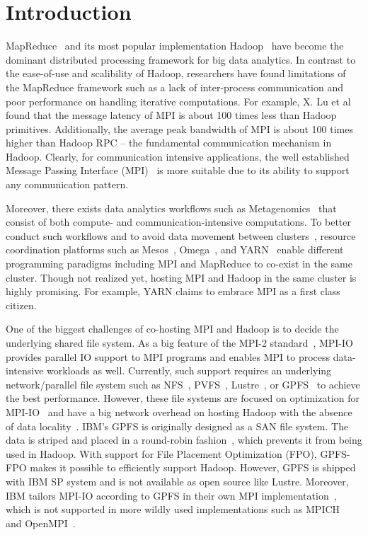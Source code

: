 \section{Introduction}
MapReduce~\cite{mr} and its most popular implementation Hadoop~\cite{hadoop}
have become the dominant distributed processing framework for big data
analytics. In contrast to the ease-of-use and scalibility of Hadoop, researchers
have found limitations of the MapReduce framework such as a lack of inter-process
communication and poor performance on handling iterative computations. For
example, X. Lu et al~\cite{xlu} found that the message latency of MPI is about
100 times less than Hadoop primitives. Additionally, the average peak bandwidth of MPI is
about 100 times higher than Hadoop RPC -- the fundamental communication
mechanism in Hadoop. Clearly, for communication intensive applications, the well established Message Passing
Interface (MPI)~\cite{mpi2012} is more suitable due to its ability to support
any communication pattern.
 
Moreover, there exists data analytics workflows such as
Metagenomics~\cite{meta} that consist of both compute- and communication-intensive
computations. To better conduct such workflows and to avoid data
movement between clusters~\cite{catch}, resource coordination platforms such as
Mesos~\cite{mesos}, Omega~\cite{omega}, and YARN~\cite{yarn2013} enable different
programming paradigms including MPI and MapReduce to co-exist in the same
cluster. Though not realized yet, hosting MPI and Hadoop in the same cluster is
highly promising. For example, YARN claims to embrace MPI as a first class citizen.

One of the biggest challenges of co-hosting MPI and Hadoop is to decide the
underlying shared file system. As a big feature of the MPI-2 standard~\cite{mpi2012},
MPI-IO provides parallel IO support to MPI programs and enables MPI to process
data-intensive workloads as well. Currently, such support requires an underlying
network/parallel file system such as NFS~\cite{nfs1}, PVFS~\cite{pvfs},
Lustre~\cite{lustre}, or GPFS~\cite{gpfs} to achieve the best performance. However,
these file systems are focused on optimization for MPI-IO~\cite{mpipvfs,
mpilustre1, mpigpfs} and have a big network overhead on hosting Hadoop with the
absence of data locality~\cite{hadooplustre}. IBM's GPFS is originally designed
as a SAN file system. The data is striped and placed in a round-robin
fashion~\cite{gpfs}, which prevents it from being used in Hadoop. With support
for File Placement Optimization (FPO), GPFS-FPO makes it possible to efficiently
support Hadoop.  However, GPFS is shipped with IBM SP system and is not
available as open source like Lustre. Moreover, IBM tailors MPI-IO according to
GPFS in their own MPI implementation~\cite{mpigpfs}, which is not supported in
more wildly used implementations such as MPICH~\cite{mpich} and
OpenMPI~\cite{openmpi}.

